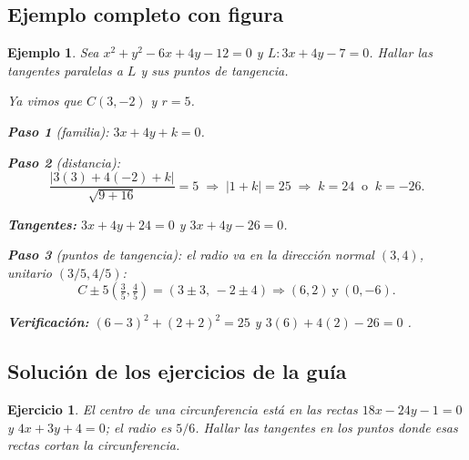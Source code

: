 \documentclass[11pt,a4paper]{article}
\theoremstyle{ej}
\newtheorem{ejemplo}{Ejemplo}[section]
\newtheorem{ejercicio}{Ejercicio}[section]
\begin{document}
\subsection{Ejemplo completo con figura}

\begin{ejemplo}
Sea $x^2+y^2-6x+4y-12=0$ y $L:3x+4y-7=0$. Hallar las tangentes paralelas a $L$
y sus puntos de tangencia.

Ya vimos que $C(3,-2)$ y $r=5$.

\textbf{Paso 1} (familia): $3x+4y+k=0$.

\textbf{Paso 2} (distancia):
\[ \frac{|3(3)+4(-2)+k|}{\sqrt{9+16}}=5
\;\Longrightarrow\; |1+k|=25
\;\Longrightarrow\; k=24\ \text{ o }\ k=-26. \]

\textbf{Tangentes:} $3x+4y+24=0$ y $3x+4y-26=0$.

\textbf{Paso 3} (puntos de tangencia): el radio va en la dirección normal $(3,4)$, unitario $(3/5,4/5)$:
\[ C\pm 5\left(\tfrac35,\tfrac45\right)=(3\pm3,\,-2\pm4)\Rightarrow (6,2)\ \text{y}\ (0,-6). \]

\textbf{Verificación:} $(6-3)^2+(2+2)^2=25$ \checkmark \quad y \quad $3(6)+4(2)-26=0$ \checkmark.

\begin{center}
\end{center}
\end{ejemplo}

\subsection{Solución de los ejercicios de la guía}

\begin{ejercicio}
El centro de una circunferencia está en las rectas $18x-24y-1=0$ y $4x+3y+4=0$; el radio es $5/6$.
Hallar las tangentes en los puntos donde esas rectas cortan la circunferencia.
\end{ejercicio}
\end{document}
